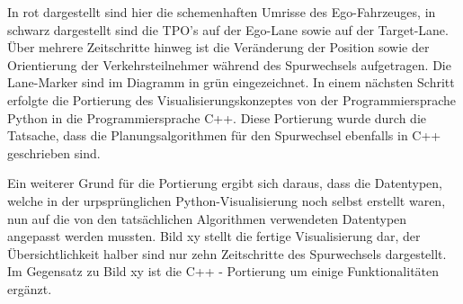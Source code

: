 In rot dargestellt sind hier die schemenhaften Umrisse des Ego-Fahrzeuges, in schwarz dargestellt sind die TPO's auf der Ego-Lane sowie auf der Target-Lane. Über mehrere Zeitschritte hinweg ist die Veränderung der Position sowie der Orientierung der Verkehrsteilnehmer während des Spurwechsels aufgetragen. Die Lane-Marker sind im Diagramm in grün eingezeichnet. 
In einem nächsten Schritt erfolgte die Portierung des Visualisierungskonzeptes von der Programmiersprache Python in die Programmiersprache C++. Diese Portierung wurde durch die Tatsache, dass die Planungsalgorithmen für den Spurwechsel ebenfalls in C++ geschrieben sind.


Ein weiterer Grund für die Portierung ergibt sich daraus, dass die Datentypen, welche in der urpsprünglichen Python-Visualisierung noch selbst erstellt waren, nun auf die von den tatsächlichen Algorithmen verwendeten Datentypen angepasst werden mussten. Bild xy stellt die fertige Visualisierung dar, der Übersichtlichkeit halber sind nur zehn Zeitschritte des Spurwechsels dargestellt. Im Gegensatz zu Bild xy ist die C++ - Portierung um einige Funktionalitäten ergänzt.
